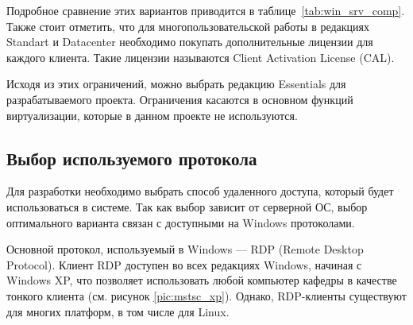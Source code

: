 Подробное сравнение этих вариантов приводится в таблице~\ref{tab:win_srv_comp}.
Также стоит отметить, что для многопользовательской работы в редакциях Standart и
Datacenter необходимо покупать дополнительные лицензии для каждого клиента. Такие
лицензии называются Client Activation License (CAL).

Исходя из этих ограничений, можно выбрать редакцию Essentials для разрабатываемого
проекта. Ограничения касаются в основном функций виртуализации, которые в данном проекте
не используются.

\subsection{Выбор используемого протокола}

Для разработки необходимо выбрать способ удаленного доступа, который будет
использоваться в системе. Так как выбор зависит от серверной ОС, выбор оптимального
варианта связан с доступными на Windows протоколами.

Основной протокол, используемый в Windows — RDP (Remote Desktop Protocol). Клиент RDP
доступен во всех редакциях Windows, начиная с Windows XP, что позволяет использовать
любой компьютер кафедры в качестве тонкого клиента (см. рисунок \ref{pic:mstsc_xp}).
Однако, RDP-клиенты существуют для многих платформ, в том числе для Linux.

